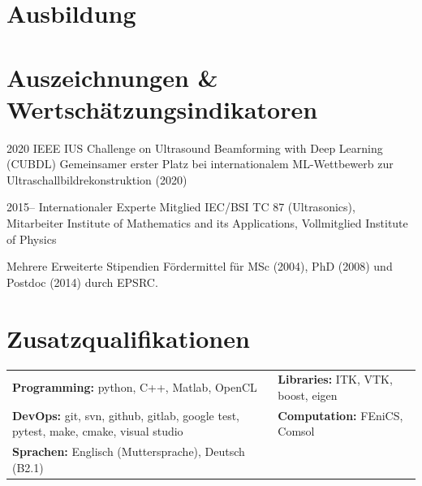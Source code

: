 \documentclass[german, print]{cv-style-wide}
\begin{document}
\section{Ausbildung}

\begin{entrylist}
\end{entrylist}

\section{Auszeichnungen \& Wertschätzungsindikatoren}

\begin{entrylist}
\entry
  {2020}
  {IEEE IUS Challenge on Ultrasound Beamforming with Deep Learning (CUBDL)}
  {}
  {Gemeinsamer erster Platz bei internationalem ML-Wettbewerb zur Ultraschallbildrekonstruktion (2020)}

\entry
  {2015--}
  {Internationaler Experte}
  {}
  {Mitglied IEC/BSI TC 87 (Ultrasonics), Mitarbeiter Institute of Mathematics and its Applications, Vollmitglied Institute of Physics}

\entry
  {Mehrere}
  {Erweiterte Stipendien}
  {}
  {Fördermittel für MSc (2004), PhD (2008) und Postdoc (2014) durch EPSRC.}
\end{entrylist}

\section{Zusatzqualifikationen}

\begin{tabular}{p{} p{}}
\textbf{Programming:} python, C++, Matlab, OpenCL & \textbf{Libraries:} ITK, VTK, boost, eigen \\
\textbf{DevOps:} git, svn, github, gitlab, google test, pytest, make, cmake, visual studio & \textbf{Computation:} FEniCS, Comsol \\
\textbf{Sprachen:} Englisch (Muttersprache), Deutsch (B2.1) & \\
\end{tabular}
\end{document}
